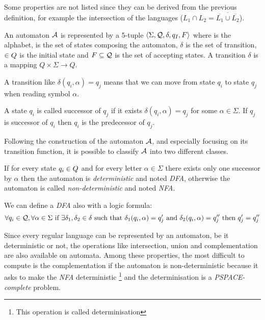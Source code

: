 Some properties are not listed since they can be derived from the previous definition, for example the intersection of the languages ($L_1 \cap L_2 = \overline{\overline{L_1} \cup \overline{L_2}}$).

\begin{definition}[Automaton]
  An automaton $\mathcal{A}$ is represented by a 5-tuple $\left\langle \Sigma, \mathcal{Q}, \delta, q_I, F\right\rangle $ where \alphabet{} is the alphabet, \states{} is the set of states composing the automaton, $\delta$ is the set of transition, \qzero{} $\in Q{}$ is the initial state and $F \subseteq \mathcal{Q}$ is the set of accepting states. A transition $\delta$ is a mapping $Q \times \Sigma \rightarrow Q$.
\end{definition}

\begin{example}
  A transition like $\delta(q_i, \alpha) = q_j$ means that we can move from state $q_i$ to state $q_j$ when reading symbol $\alpha$.
\end{example}

A state $q_i$ is called successor of $q_j$ if it exists $\delta(q_i, \alpha) = q_j$ for some $\alpha \in \Sigma$. If $q_j$ is successor of $q_i$ then $q_i$ is the predecessor of $q_j$.

Following the construction of the automaton $\mathcal{A}$, and especially focusing on its transition function, it is possible to classify $\mathcal{A}$ into two different classes.

\begin{definition}
  If for every state $q_i \in Q{}$ and for every letter $\alpha \in \Sigma$ there exists only one successor by $\alpha$ then the automaton is \textit{deterministic} and noted \textit{DFA}, otherwise the automaton is called \textit{non-deterministic} and noted \textit{NFA}.
\end{definition}

We can define a \textit{DFA} also with a logic formula:
\[\forall q_i \in \mathcal{Q}, \forall \alpha \in \Sigma \text{ if } \exists \delta_1, \delta_2 \in \delta \text{ such that } \delta_1(q_i, \alpha) = q_j' \text{ and } \delta_2(q_i, \alpha) = q_j'' \text{ then } q_j' = q_j'' \]

Since every regular language can be represented by an automaton, be it deterministic or not, the operations like intersection, union and complementation are also available on automata. Among these properties, the most difficult to compute is the complementation if the automaton is non-deterministic because it asks to make the \textit{NFA} deterministic \footnote{This operation is called determinisation} and the determinisation is a \textit{PSPACE-complete} problem.

